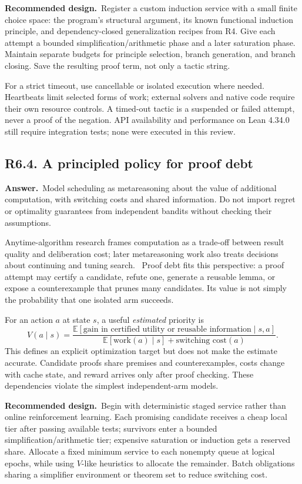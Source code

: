 \documentclass[11pt,a4paper]{article}
\newcommand{\qid}[3]{\subsection{#2. #3}\label{#1}}
\newcommand{\answer}{\noindent\textbf{Answer.}\ }
\newcommand{\proposal}{\noindent\textbf{Recommended design.}\ }
\theoremstyle{remark}
\begin{document}
\proposal Register a custom induction service with a small finite choice space: the program's structural argument, its known functional induction principle, and dependency-closed generalization recipes from R4. Give each attempt a bounded simplification/arithmetic phase and a later saturation phase. Maintain separate budgets for principle selection, branch generation, and branch closing. Save the resulting proof term, not only a tactic string.

For a strict timeout, use cancellable or isolated execution where needed. Heartbeats limit selected forms of work; external solvers and native code require their own resource controls. A timed-out tactic is a suspended or failed attempt, never a proof of the negation. API availability and performance on Lean 4.34.0 still require integration tests; none were executed in this review.

\qid{q64}{R6.4}{A principled policy for proof debt}
\answer Model scheduling as metareasoning about the value of additional computation, with switching costs and shared information. Do not import regret or optimality guarantees from independent bandits without checking their assumptions.

Anytime-algorithm research frames computation as a trade-off between result quality and deliberation cost; later metareasoning work also treats decisions about continuing and tuning search.~\cite{anytime,metareasoning} Proof debt fits this perspective: a proof attempt may certify a candidate, refute one, generate a reusable lemma, or expose a counterexample that prunes many candidates. Its value is not simply the probability that one isolated arm succeeds.

For an action $a$ at state $s$, a useful \emph{estimated} priority is
\[
 V(a\mid s)=
 \frac{\mathbb E[\text{gain in certified utility or reusable information}\mid s,a]}
 {\mathbb E[\text{work}(a)\mid s]+\text{switching cost}(a)}.
\]
This defines an explicit optimization target but does not make the estimate accurate. Candidate proofs share premises and counterexamples, costs change with cache state, and reward arrives only after proof checking. These dependencies violate the simplest independent-arm models.

\proposal Begin with deterministic staged service rather than online reinforcement learning. Each promising candidate receives a cheap local tier after passing available tests; survivors enter a bounded simplification/arithmetic tier; expensive saturation or induction gets a reserved share. Allocate a fixed minimum service to each nonempty queue at logical epochs, while using $V$-like heuristics to allocate the remainder. Batch obligations sharing a simplifier environment or theorem set to reduce switching cost.
\end{document}
